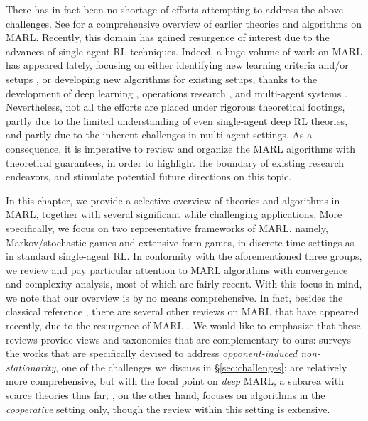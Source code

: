 There has in fact  been no shortage of efforts attempting to address the above   challenges. See \cite{bu2008comprehensive} for a comprehensive overview of earlier theories and algorithms on MARL. Recently, this  domain has gained resurgence of interest due to the advances of single-agent RL techniques. Indeed, a huge volume of work on MARL has appeared   lately, focusing on either identifying new learning criteria and/or setups \cite{foerster2016learning,zazo2016dynamic,zhang2018fully,subramanian2019reinforcement}, or developing new algorithms for existing setups, thanks to the development of deep learning \cite{heinrich2016deep,lowe2017multi,foerster2017counterfactual,gupta2017cooperative,omidshafiei2017deep,kawamura2017neural,zhang2019monte}, operations  research \cite{mazumdar2018convergence,jin2019minmax,zhang2019policyb,sidford2019solving}, and multi-agent systems \cite{oliehoek2016concise,arslan2017decentralized,yongacoglu2019learning,zhang2019online}.  
Nevertheless, not all the efforts are placed under rigorous theoretical footings, partly due to the limited understanding of even single-agent deep RL theories, and partly due to the inherent challenges in  multi-agent settings. As a consequence, it is imperative to review and organize the MARL algorithms with theoretical guarantees, in order to highlight the boundary of existing research endeavors, and stimulate potential future directions on this topic.   
 
In this chapter, we provide a selective overview of  theories and algorithms in MARL, together with several significant while challenging applications. More specifically, we focus on two representative frameworks of MARL, namely, Markov/stochastic games and extensive-form games, in discrete-time settings as in standard single-agent RL. In conformity with the aforementioned three groups, we review and pay particular attention to   MARL algorithms with convergence and complexity analysis, most of which are fairly recent. 
With this focus in mind, we note that our overview is by no means comprehensive. 
In fact, besides the classical reference  \cite{bu2008comprehensive}, 
there are several other reviews on MARL that have appeared recently, due to the resurgence of MARL \cite{hernandez2017survey,hernandez2018multiagent,nguyen2018deep,oroojlooyjadid2019review}. 
We would like to emphasize that these reviews provide views and taxonomies  that are complementary   to ours:  \cite{hernandez2017survey} surveys the works that are specifically devised to address \emph{opponent-induced non-stationarity}, one of the challenges we discuss in \S\ref{sec:challenges}; \cite{hernandez2018multiagent,nguyen2018deep} are relatively more comprehensive, but with the focal point on \emph{deep} MARL, a subarea with scarce theories thus far; \cite{oroojlooyjadid2019review}, on the other hand, focuses on  algorithms in the  \emph{cooperative} setting only, though the review within this setting is extensive. 

